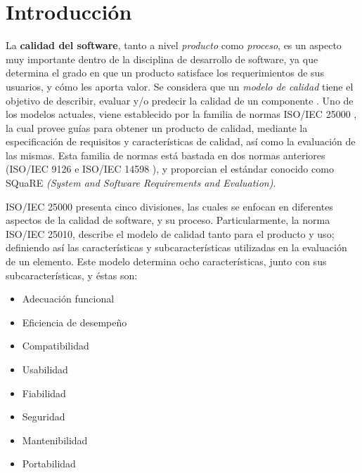 \section{Introducción}

La \textbf{calidad del software}, tanto a nivel \textit{producto} como \textit{proceso}, 
es un aspecto muy importante dentro de la disciplina de desarrollo de software, ya que
determina el grado en que un producto satisface los requerimientos de sus usuarios, y cómo
les aporta valor.
Se considera que un \textit{modelo de calidad} tiene el objetivo de describir, evaluar y/o 
predecir la calidad de un componente \cite{Wagner2013}.
Uno de los modelos actuales, viene establecido por la familia de normas ISO/IEC 25000 \cite{ref}, 
la cual provee guías para obtener un producto de calidad, mediante la especificación 
de requisitos y características de calidad, así como la evaluación de las mismas.
Esta familia de normas está bastada en dos normas anteriores (ISO/IEC 9126 \cite{ref}
e ISO/IEC 14598 \cite{ref}), y proporcian el estándar conocido como SQuaRE 
\textit{(System and Software Requirements and Evaluation)}.

ISO/IEC 25000 presenta cinco divisiones, las cuales se enfocan en diferentes aspectos
de la calidad de software, y su proceso.
Particularmente, la norma ISO/IEC 25010, describe el modelo de calidad tanto para el producto
y uso; definiendo así las características y subcaracterísticas utilizadas en la evaluación
de un elemento.
Este modelo determina ocho características, junto con sus subcaracterísticas, y éstas son:
\begin{itemize}
    \item Adecuación funcional
    \item Eficiencia de desempeño
    \item Compatibilidad
    \item Usabilidad
    \item Fiabilidad
    \item Seguridad
    \item Mantenibilidad
    \item Portabilidad
\end{itemize}

